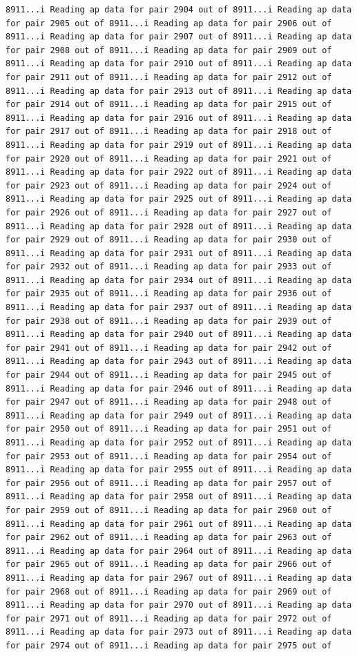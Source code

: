 \documentclass[
]{article}
\begin{document}
\begin{verbatim}
8911...i Reading ap data for pair 2904 out of 8911...i Reading ap data for pair 2905 out of 8911...i Reading ap data for pair 2906 out of 8911...i Reading ap data for pair 2907 out of 8911...i Reading ap data for pair 2908 out of 8911...i Reading ap data for pair 2909 out of 8911...i Reading ap data for pair 2910 out of 8911...i Reading ap data for pair 2911 out of 8911...i Reading ap data for pair 2912 out of 8911...i Reading ap data for pair 2913 out of 8911...i Reading ap data for pair 2914 out of 8911...i Reading ap data for pair 2915 out of 8911...i Reading ap data for pair 2916 out of 8911...i Reading ap data for pair 2917 out of 8911...i Reading ap data for pair 2918 out of 8911...i Reading ap data for pair 2919 out of 8911...i Reading ap data for pair 2920 out of 8911...i Reading ap data for pair 2921 out of 8911...i Reading ap data for pair 2922 out of 8911...i Reading ap data for pair 2923 out of 8911...i Reading ap data for pair 2924 out of 8911...i Reading ap data for pair 2925 out of 8911...i Reading ap data for pair 2926 out of 8911...i Reading ap data for pair 2927 out of 8911...i Reading ap data for pair 2928 out of 8911...i Reading ap data for pair 2929 out of 8911...i Reading ap data for pair 2930 out of 8911...i Reading ap data for pair 2931 out of 8911...i Reading ap data for pair 2932 out of 8911...i Reading ap data for pair 2933 out of 8911...i Reading ap data for pair 2934 out of 8911...i Reading ap data for pair 2935 out of 8911...i Reading ap data for pair 2936 out of 8911...i Reading ap data for pair 2937 out of 8911...i Reading ap data for pair 2938 out of 8911...i Reading ap data for pair 2939 out of 8911...i Reading ap data for pair 2940 out of 8911...i Reading ap data for pair 2941 out of 8911...i Reading ap data for pair 2942 out of 8911...i Reading ap data for pair 2943 out of 8911...i Reading ap data for pair 2944 out of 8911...i Reading ap data for pair 2945 out of 8911...i Reading ap data for pair 2946 out of 8911...i Reading ap data for pair 2947 out of 8911...i Reading ap data for pair 2948 out of 8911...i Reading ap data for pair 2949 out of 8911...i Reading ap data for pair 2950 out of 8911...i Reading ap data for pair 2951 out of 8911...i Reading ap data for pair 2952 out of 8911...i Reading ap data for pair 2953 out of 8911...i Reading ap data for pair 2954 out of 8911...i Reading ap data for pair 2955 out of 8911...i Reading ap data for pair 2956 out of 8911...i Reading ap data for pair 2957 out of 8911...i Reading ap data for pair 2958 out of 8911...i Reading ap data for pair 2959 out of 8911...i Reading ap data for pair 2960 out of 8911...i Reading ap data for pair 2961 out of 8911...i Reading ap data for pair 2962 out of 8911...i Reading ap data for pair 2963 out of 8911...i Reading ap data for pair 2964 out of 8911...i Reading ap data for pair 2965 out of 8911...i Reading ap data for pair 2966 out of 8911...i Reading ap data for pair 2967 out of 8911...i Reading ap data for pair 2968 out of 8911...i Reading ap data for pair 2969 out of 8911...i Reading ap data for pair 2970 out of 8911...i Reading ap data for pair 2971 out of 8911...i Reading ap data for pair 2972 out of 8911...i Reading ap data for pair 2973 out of 8911...i Reading ap data for pair 2974 out of 8911...i Reading ap data for pair 2975 out of 
\end{verbatim}
\end{document}
